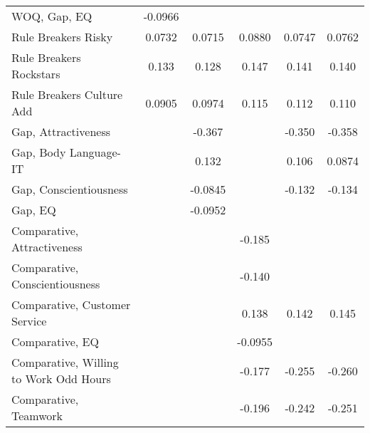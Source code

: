{\begin{tabular}{l*{5}{c}}
\addlinespace
WOQ, Gap, EQ             &     -0.0966         &                     &                     &                     &                     \\
\addlinespace
Rule Breakers Risky      &      0.0732\sym{*}  &      0.0715\sym{*}  &      0.0880\sym{**} &      0.0747\sym{*}  &      0.0762\sym{*}  \\
\addlinespace
Rule Breakers Rockstars  &       0.133\sym{**} &       0.128\sym{**} &       0.147\sym{**} &       0.141\sym{**} &       0.140\sym{**} \\
\addlinespace
Rule Breakers Culture Add&      0.0905         &      0.0974\sym{*}  &       0.115\sym{**} &       0.112\sym{**} &       0.110\sym{**} \\
\addlinespace
Gap, Attractiveness      &                     &      -0.367\sym{***}&                     &      -0.350\sym{***}&      -0.358\sym{***}\\
\addlinespace
Gap, Body Language-IT    &                     &       0.132         &                     &       0.106         &      0.0874         \\
\addlinespace
Gap, Conscientiousness   &                     &     -0.0845         &                     &      -0.132\sym{**} &      -0.134\sym{**} \\
\addlinespace
Gap, EQ                  &                     &     -0.0952         &                     &                     &                     \\
\addlinespace
Comparative, Attractiveness&                    &                     &      -0.185\sym{*}  &                     &                     \\
\addlinespace
Comparative, Conscientiousness&                     &                     &      -0.140         &                     &                     \\
\addlinespace
Comparative, Customer Service&                     &                     &       0.138         &       0.142\sym{*}  &       0.145\sym{*}  \\
\addlinespace
Comparative, EQ          &                     &                     &     -0.0955         &                     &                     \\
\addlinespace
Comparative, Willing to Work Odd Hours&                     &                     &      -0.177\sym{*}  &      -0.255\sym{***}&      -0.260\sym{***}\\
\addlinespace
Comparative, Teamwork    &                     &                     &      -0.196\sym{*}  &      -0.242\sym{**} &      -0.251\sym{**} \\

\end{tabular}}

